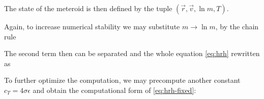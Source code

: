         The state of the meteroid is then defined by the tuple $(\vec{r}, \vec{v}, \ln m, T)$.


        Again, to increase numerical stability we may substitute $m \to \ln m$,
        by the chain rule

        The second term then can be separated and the whole equation \ref{eq:hrh} rewritten as

        To further optimize the computation, we may precompute another constant
        $c_T = 4 \sigma \epsilon$ and obtain the computational form of \cref{eq:hrh-fixed}:




